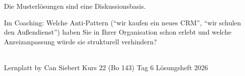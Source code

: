 \documentclass[11pt,a4paper,oneside]{article}
\begin{document}
\noindent Die Musterlösungen sind eine Diskussionsbasis.

\medskip
\begin{infobox}
Im Coaching: Welche Anti-Pattern (``wir kaufen ein neues CRM'', ``wir schulen den Außendienst'') haben Sie in Ihrer Organisation schon erlebt \textendash{} und welche Anreizanpassung würde sie strukturell verhindern?
\end{infobox}

\vspace{1cm}
\noindent{\color{lpAccent}\rule{\linewidth}{0.6pt}}\\[4pt]
{\footnotesize\sffamily\color{lpGray}Lernplatt \textperiodcentered{} by Can Siebert \textperiodcentered{} Kurs 22 (Bo 143) \textperiodcentered{} Tag 6 \textperiodcentered{} Lösungsheft \textperiodcentered{} \textcopyright{} 2026}
\end{document}
